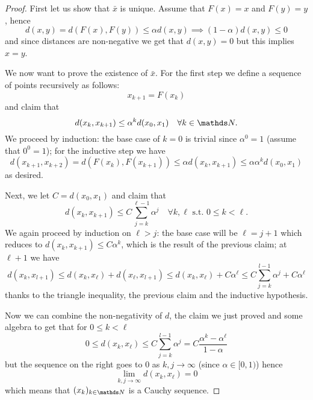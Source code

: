 \documentclass[12pt]{extarticle}
\numberwithin{equation}{section}
\begin{document}
\begin{proof}
	First let us show that $\bar x$ is unique.
	Assume that $F(x) = x$ and $F(y) = y$, hence
	\begin{equation}
		d(x, y) = d(F(x), F(y)) \leq \alpha d(x, y) \implies (1-\alpha) d(x, y) \leq 0
	\end{equation}
	and since distances are non-negative we get that $d(x, y) = 0$ but this implies $x = y$.

	We now want to prove the existence of $\bar x$.
	For the first step we define a sequence of points recursively as follows:
	\begin{equation}
		x_{k + 1} = F(x_k)
	\end{equation}
	and claim that
	\begin{equation}
		d(x_k, x_{k+1}) \leq \alpha^k d(x_0, x_1) \quad \forall k \in \N .
	\end{equation}
	We proceed by induction: the base case of $k = 0$ is trivial since $\alpha^0 = 1$ (assume that $0^0=1$);
	for the inductive step we have
	\begin{equation}
		d(x_{k+1}, x_{k+2}) = d(F(x_k), F(x_{k+1})) \leq \alpha d(x_k, x_{k+1}) \leq \alpha \alpha^k d(x_0, x_1)
	\end{equation}
	as desired.

	Next, we let $C = d(x_0, x_1)$ and claim that
	\begin{equation}
		d(x_k, x_{k+1}) \leq C \sum_{j = k}^{\ell-1} \alpha^j \quad \forall k, \ell \text{ s.t. } 0 \leq k < \ell.
	\end{equation}
	We again proceed by induction on $\ell > j$:
	the base case will be $\ell = j + 1$ which reduces to $d(x_k, x_{k+1}) \leq C \alpha^k$, which is the result of the previous claim;
	at $\ell + 1$ we have
	\begin{equation}
		d(x_k, x_{l+1}) \leq d(x_k, x_\ell) + d(x_\ell, x_{l + 1}) \leq d(x_k, x_\ell) + C \alpha^\ell \leq C\sum_{j = k}^{l-1} \alpha^j + C \alpha^\ell
	\end{equation}
	thanks to the triangle inequality, the previous claim and the inductive hypothesis.

	Now we can combine the non-negativity of $d$, the claim we just proved and some algebra to get that for $0 \leq k < \ell$
	\begin{equation}
		0 \leq d(x_k, x_\ell) \leq C \sum_{j = k}^{l-1} \alpha^j = C \frac{\alpha^k - \alpha^\ell}{1-\alpha}
	\end{equation}
	but the sequence on the right goes to $0$ as $k, j \to \infty$ (since $\alpha \in [0, 1)$) hence
	\begin{equation}
		\lim_{k, j \to \infty} d(x_k, x_{\ell}) = 0
	\end{equation}
	which means that $(x_k)_{k \in \N}$ is a Cauchy sequence.


\end{proof}
\end{document}

